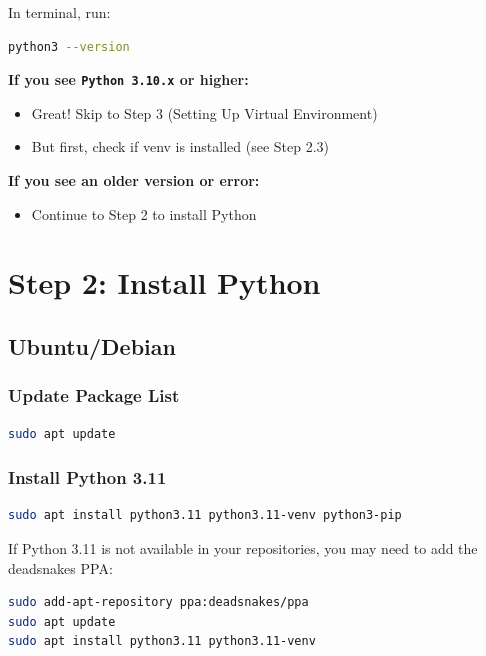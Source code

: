 \documentclass[11pt,a4paper]{article}
\begin{document}
In terminal, run:
\begin{lstlisting}[language=bash]
python3 --version
\end{lstlisting}

\textbf{If you see \texttt{Python 3.10.x} or higher:}
\begin{itemize}
    \item Great! Skip to Step 3 (Setting Up Virtual Environment)
    \item But first, check if venv is installed (see Step 2.3)
\end{itemize}

\textbf{If you see an older version or error:}
\begin{itemize}
    \item Continue to Step 2 to install Python
\end{itemize}

\section{Step 2: Install Python}

\subsection{Ubuntu/Debian}

\subsubsection{Update Package List}

\begin{lstlisting}[language=bash]
sudo apt update
\end{lstlisting}

\subsubsection{Install Python 3.11}

\begin{lstlisting}[language=bash]
sudo apt install python3.11 python3.11-venv python3-pip
\end{lstlisting}

\begin{infobox}
If Python 3.11 is not available in your repositories, you may need to add the deadsnakes PPA:
\begin{lstlisting}[language=bash]
sudo add-apt-repository ppa:deadsnakes/ppa
sudo apt update
sudo apt install python3.11 python3.11-venv
\end{lstlisting}
\end{infobox}
\end{document}
